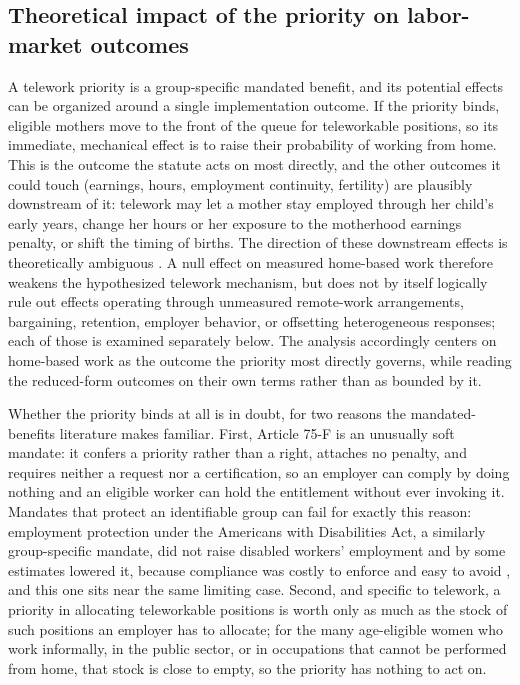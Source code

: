 \documentclass[12pt]{article}
\begin{document}
\subsection{Theoretical impact of the priority on labor-market outcomes}\label{sec:framework}

A telework priority is a group-specific mandated benefit, and its potential effects can be organized around a single implementation outcome. If the priority binds, eligible mothers move to the front of the queue for teleworkable positions, so its immediate, mechanical effect is to raise their probability of working from home. This is the outcome the statute acts on most directly, and the other outcomes it could touch (earnings, hours, employment continuity, fertility) are plausibly downstream of it: telework may let a mother stay employed through her child's early years, change her hours or her exposure to the motherhood earnings penalty, or shift the timing of births. The direction of these downstream effects is theoretically ambiguous \citep{goldin2014,olivettipetrongolo2017}. A null effect on measured home-based work therefore weakens the hypothesized telework mechanism, but does not by itself logically rule out effects operating through unmeasured remote-work arrangements, bargaining, retention, employer behavior, or offsetting heterogeneous responses; each of those is examined separately below. The analysis accordingly centers on home-based work as the outcome the priority most directly governs, while reading the reduced-form outcomes on their own terms rather than as bounded by it.

Whether the priority binds at all is in doubt, for two reasons the mandated-benefits literature makes familiar. First, Article 75-F is an unusually soft mandate: it confers a priority rather than a right, attaches no penalty, and requires neither a request nor a certification, so an employer can comply by doing nothing and an eligible worker can hold the entitlement without ever invoking it. Mandates that protect an identifiable group can fail for exactly this reason: employment protection under the Americans with Disabilities Act, a similarly group-specific mandate, did not raise disabled workers' employment and by some estimates lowered it, because compliance was costly to enforce and easy to avoid \citep{acemogluangrist2001}, and this one sits near the same limiting case. Second, and specific to telework, a priority in allocating teleworkable positions is worth only as much as the stock of such positions an employer has to allocate; for the many age-eligible women who work informally, in the public sector, or in occupations that cannot be performed from home, that stock is close to empty, so the priority has nothing to act on.
\end{document}
